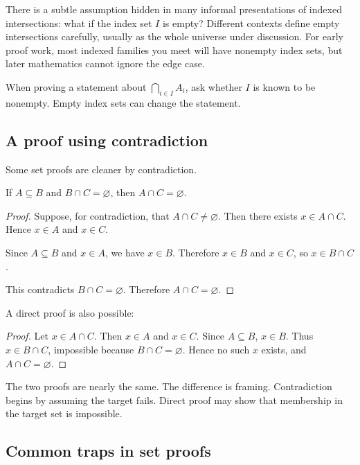 There is a subtle assumption hidden in many informal presentations of indexed intersections: what if the index set $I$ is empty? Different contexts define empty intersections carefully, usually as the whole universe under discussion. For early proof work, most indexed families you meet will have nonempty index sets, but later mathematics cannot ignore the edge case.

\begin{trapbox}
When proving a statement about $\bigcap_{i\in I}A_i$, ask whether $I$ is known to be nonempty. Empty index sets can change the statement.
\end{trapbox}

\subsection{A proof using contradiction}

Some set proofs are cleaner by contradiction.

\begin{theorem}
If $A\subseteq B$ and $B\cap C=\varnothing$, then $A\cap C=\varnothing$.
\end{theorem}

\begin{proof}
Suppose, for contradiction, that $A\cap C\neq\varnothing$. Then there exists $x\in A\cap C$. Hence $x\in A$ and $x\in C$.

Since $A\subseteq B$ and $x\in A$, we have $x\in B$. Therefore $x\in B$ and $x\in C$, so $x\in B\cap C$.

This contradicts $B\cap C=\varnothing$. Therefore $A\cap C=\varnothing$.
\end{proof}

A direct proof is also possible:

\begin{proof}
Let $x\in A\cap C$. Then $x\in A$ and $x\in C$. Since $A\subseteq B$, $x\in B$. Thus $x\in B\cap C$, impossible because $B\cap C=\varnothing$. Hence no such $x$ exists, and $A\cap C=\varnothing$.
\end{proof}

The two proofs are nearly the same. The difference is framing. Contradiction begins by assuming the target fails. Direct proof may show that membership in the target set is impossible.

\subsection{Common traps in set proofs}

